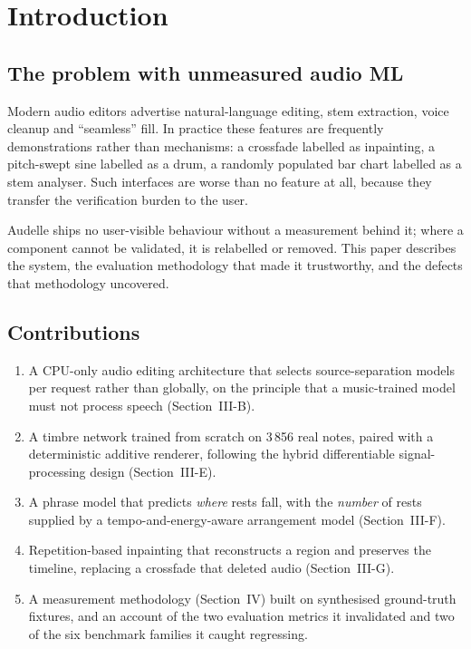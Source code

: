 \documentclass[conference]{IEEEtran}
\begin{document}
\section{Introduction}

\subsection{The problem with unmeasured audio ML}

Modern audio editors advertise natural-language editing, stem extraction, voice
cleanup and ``seamless'' fill. In practice these features are frequently
demonstrations rather than mechanisms: a crossfade labelled as inpainting, a
pitch-swept sine labelled as a drum, a randomly populated bar chart labelled
as a stem analyser. Such interfaces are worse than no feature at all, because
they transfer the verification burden to the user.

Audelle ships no user-visible behaviour without a measurement behind it; where
a component cannot be validated, it is relabelled or removed. This paper
describes the system, the evaluation methodology that made it trustworthy, and
the defects that methodology uncovered.

\subsection{Contributions}

\begin{enumerate}
\item A CPU-only audio editing architecture that selects source-separation
      models per request rather than globally, on the principle that a
      music-trained model must not process speech (Section~III-B).
\item A timbre network trained from scratch on 3\,856 real notes, paired with a
      deterministic additive renderer, following the hybrid
      differentiable signal-processing design (Section~III-E).
\item A phrase model that predicts \emph{where} rests fall, with the
      \emph{number} of rests supplied by a tempo-and-energy-aware arrangement
      model (Section~III-F).
\item Repetition-based inpainting that reconstructs a region and preserves the
      timeline, replacing a crossfade that deleted audio (Section~III-G).
\item A measurement methodology (Section~IV) built on synthesised ground-truth
      fixtures, and an account of the two evaluation metrics it invalidated and
      two of the six benchmark families it caught regressing.
\end{enumerate}
\end{document}
